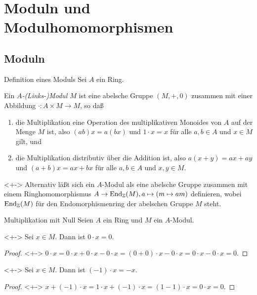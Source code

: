 \section{Moduln und Modulhomomorphismen}

\subsection{Moduln}

\begin{frame}{Definition eines Moduls}
	Sei \(A\) ein Ring.
	\begin{definition}
		Ein \emph{\(A\)-(Links-)Modul \(M\)} ist eine abelsche Gruppe \((M, +, 0)\) 
		zusammen mit einer Abbildung \(\cdot\colon A \times M \to M\), so daß
		\begin{enumerate}[<+->]
		\item
			die Multiplikation eine Operation des multiplikativen Monoides von
			\(A\) auf der Menge \(M\) ist, also \((ab) x = a (b x)\) und
			\(1 \cdot x = x\) für alle \(a, b \in A\) und \(x \in M\) gilt, und
		\item
			die Multiplikation distributiv über die Addition ist, also
			\(a (x + y) = a x + a y\) und \((a + b) x = a x + b x\) für alle
			\(a, b \in A\) und \(x, y \in M\).
		\end{enumerate}
	\end{definition}
	\begin{remark}<+->
		Alternativ läßt sich ein \(A\)-Modul als eine abelsche Gruppe zusammen mit
		einem Ringhomomorphismus \(A \to \operatorname{End}_{\mathbb Z}(M), a \mapsto (m \mapsto a m)\)
		definieren, wobei \(\operatorname{End}_{\mathbb Z}(M)\) für den Endomorphismenring der
		abelschen Gruppe \(M\) steht.
	\end{remark}
\end{frame}

\begin{frame}{Multiplikation mit Null}
	Seien \(A\) ein Ring und \(M\) ein \(A\)-Modul.
    \begin{proposition}<+->
        Sei \(x \in M\). Dann ist \(0 \cdot x = 0\).
    \end{proposition}
    \begin{proof}<+->
        \(0 \cdot x = 0 \cdot x + 0 \cdot x - 0 \cdot x
        = (0 + 0) \cdot x - 0 \cdot x = 0 \cdot x - 0 \cdot x = 0.\)
    \end{proof}
    \begin{corollary}<+->
        Sei \(x \in M\). Dann ist \((-1) \cdot x = -x\).
    \end{corollary}
    \begin{proof}<+->
        \(x + (-1) \cdot x = 1 \cdot x + (-1) \cdot x
        = (1 - 1) \cdot x = 0 \cdot x = 0\).
    \end{proof}
\end{frame}

